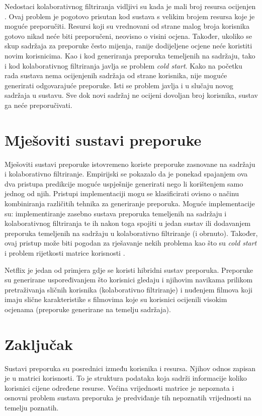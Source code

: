 \documentclass[times, utf8, seminar]{fer}
\begin{document}
Nedostaci kolaborativnog filtriranja vidljivi su kada je mali broj resursa ocijenjen . Ovaj problem je pogotovo prisutan kod sustava s velikim brojem resursa koje je moguće preporučiti. Resursi koji su vrednovani od strane malog broja korisnika gotovo nikad neće biti preporučeni, neovisno o visini ocjena. Također, ukoliko se skup sadržaja za preporuke često mijenja, ranije dodijeljene ocjene neće koristiti novim korisnicima. Kao i kod generiranja preporuka temeljenih na sadržaju, tako i kod kolaborativnog filtriranja javlja se problem \textit{cold start}. Kako na početku rada sustava nema ocijenjenih sadržaja od strane korisnika, nije moguće generirati odgovarajuće preporuke. Isti se problem javlja i u slučaju novog sadržaja u sustavu. Sve dok novi sadržaj ne ocijeni dovoljan broj korisnika, sustav ga neće preporučivati.

\chapter{Mješoviti sustavi preporuke}
Mješoviti sustavi preporuke istovremeno koriste preporuke zasnovane na sadržaju i kolaborativno filtriranje. Empirijski se pokazalo da je ponekad spajanjem ova dva pristupa predikcije moguće uspješnije generirati nego li korištenjem samo jednog od njih. Pristupi implementaciji mogu se klasificirati ovisno o načinu kombiniranja različitih tehnika za generiranje preporuka. Moguće implementacije su: implementiranje zasebno sustava preporuka temeljenih na sadržaju i kolaborativnog filtriranja te ih nakon toga spojiti u jedan sustav ili dodavanjem preporuka temeljenih na sadržaju u kolaborativno filtriranje (i obrnuto). Također, ovaj pristup može biti pogodan za rješavanje nekih problema kao što su \textit{cold start} i problem rijetkosti matrice korisnosti .

Netflix je jedan od primjera gdje se koristi hibridni sustav preporuka. Preporuke su generirane uspoređivanjem što korisnici gledaju i njihovim navikama prilikom pretraživanja sličnih korisnika (kolaborativno filtriranje) i nuđenjem filmova koji imaju slične karakteristike s filmovima koje su korisnici ocijenili visokim ocjenama (preporuke generirane na temelju sadržaja).

\chapter{Zaključak}
Sustavi preporuka su posrednici između korisnika i resursa. Njihov odnos zapisan je u matrici korisnosti. To je struktura podataka koja sadrži informacije koliko korisnici cijene određene resurse. Većina vrijednosti matrice je nepoznata i osnovni problem sustava preporuka je predviđanje tih nepoznatih vrijednosti na temelju poznatih.
\end{document}

